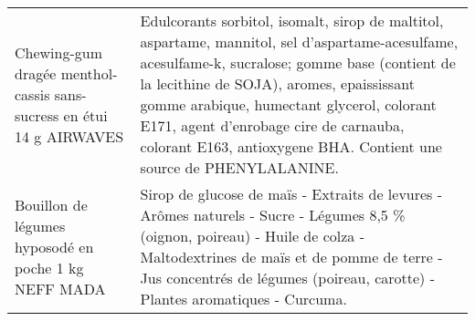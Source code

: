 \begin{longtable}{p{5cm}p{10cm}}
                                     Chewing-gum dragée menthol-cassis sans-sucress en étui 14 g AIRWAVES &                                                                                                                                                                                                                                                                                                                                                                                                                                                                                                                                                                                                                                                                              Edulcorants sorbitol, isomalt, sirop de maltitol, aspartame, mannitol, sel d'aspartame-acesulfame, acesulfame-k, sucralose; gomme base (contient de la lecithine de SOJA), aromes, epaississant gomme arabique, humectant glycerol, colorant E171, agent d'enrobage cire de carnauba, colorant E163, antioxygene BHA. Contient une source de PHENYLALANINE. \\
                                                     Bouillon de légumes hyposodé en poche 1 kg NEFF MADA &                                                                                                                                                                                                                                                                                                                                                                                                                                                                                                                                                                                                                                                                                                                                                                                Sirop de glucose de maïs - Extraits de levures - Arômes naturels - Sucre - Légumes 8,5 \% (oignon, poireau) - Huile de colza - Maltodextrines de maïs et de pomme de terre - Jus concentrés de légumes (poireau, carotte) - Plantes aromatiques - Curcuma. \\

\end{longtable}
